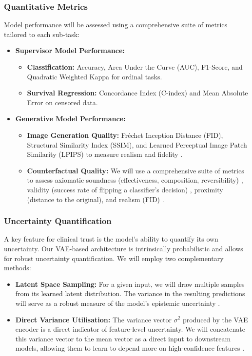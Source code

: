 \documentclass[11pt, a4paper]{article}
\begin{document}
\subsubsection{Quantitative Metrics}
Model performance will be assessed using a comprehensive suite of metrics tailored to each sub-task:
\begin{itemize}
    \item \textbf{Supervisor Model Performance:}
        \begin{itemize}
            \item \textbf{Classification:} Accuracy, Area Under the Curve (AUC), F1-Score, and Quadratic Weighted Kappa for ordinal tasks.
            \item \textbf{Survival Regression:} Concordance Index (C-index) and Mean Absolute Error on censored data.
        \end{itemize}
    \item \textbf{Generative Model Performance:}
        \begin{itemize}
            \item \textbf{Image Generation Quality:} Fréchet Inception Distance (FID), Structural Similarity Index (SSIM), and Learned Perceptual Image Patch Similarity (LPIPS) to measure realism and fidelity \cite{VigneshwaranOhara2024, Singla2022}.
            \item \textbf{Counterfactual Quality:} We will use a comprehensive suite of metrics to assess axiomatic soundness (effectiveness, composition, reversibility) \cite{KomanduriWu2023, MonteiroRibeiro2023}, validity (success rate of flipping a classifier’s decision) \cite{SinglaEslami2021, Singla2022}, proximity (distance to the original), and realism (FID) \cite{GuoDeng2024}.
        \end{itemize}
\end{itemize}

\subsubsection{Uncertainty Quantification}
A key feature for clinical trust is the model's ability to quantify its own uncertainty. Our VAE-based architecture is intrinsically probabilistic and allows for robust uncertainty quantification. We will employ two complementary methods:
\begin{itemize}
    \item \textbf{Latent Space Sampling:} For a given input, we will draw multiple samples from its learned latent distribution. The variance in the resulting predictions will serve as a robust measure of the model's epistemic uncertainty \cite{BustinMeyer2025}.
    \item \textbf{Direct Variance Utilisation:} The variance vector $\sigma^2$ produced by the VAE encoder is a direct indicator of feature-level uncertainty. We will concatenate this variance vector to the mean vector as a direct input to downstream models, allowing them to learn to depend more on high-confidence features \cite{FriedrichFrisch2024}.
\end{itemize}
\end{document}
